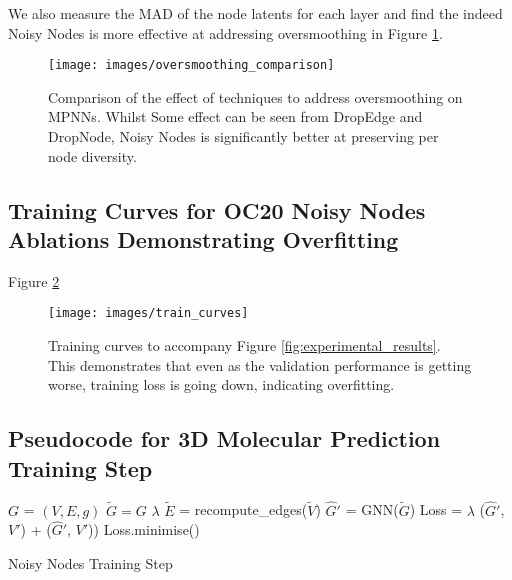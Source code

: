 \documentclass{article} \usepackage{iclr2022_conference,times}
\begin{document}
We also measure the MAD of the node latents for each layer and find the indeed Noisy Nodes is more effective at addressing oversmoothing in Figure \ref{fig:oversmoothing-comparison}.

\begin{figure}
    \centering
    \texttt{[image: images/oversmoothing\_comparison]}
    \caption{Comparison of the effect of techniques to address oversmoothing on MPNNs. Whilst Some effect can be seen from DropEdge and DropNode, Noisy Nodes is significantly better at preserving per node diversity.}
    \label{fig:oversmoothing-comparison}
\end{figure}

\subsection{Training Curves for OC20 Noisy Nodes Ablations Demonstrating Overfitting}\label{train_curves}

Figure \ref{fig:train_curves}

\begin{figure}
    \centering
    \texttt{[image: images/train\_curves]}
    \caption{Training curves to accompany Figure \ref{fig:experimental_results}. This demonstrates that even as the validation performance is getting worse, training loss is going down, indicating overfitting.}
    \label{fig:train_curves}
\end{figure}

\subsection{Pseudocode for 3D Molecular Prediction Training Step}

\begin{algorithm}[H]
\SetAlgoLined
$G$ = $(V, E, g)$  
$\tilde{G} = G$  
$\lambda$  
$\tilde{E}$ = recompute\_edges($\tilde{V}$)\;
$\hat{G}'$ = GNN($\tilde{G}$)\;
Loss = $\lambda$ ($\hat{G}'$, $V'$) + ($\hat{G}'$, $V'$))\;
Loss.minimise()
\caption{Noisy Nodes Training Step}
\end{algorithm}
\end{document}
